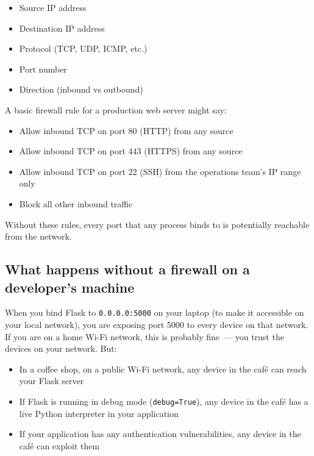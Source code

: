 \begin{itemize}
\tightlist
\item
  Source IP address
\item
  Destination IP address
\item
  Protocol (TCP, UDP, ICMP, etc.)
\item
  Port number
\item
  Direction (inbound vs outbound)
\end{itemize}

\noindent{}A basic firewall rule for a production web server might say:

\begin{itemize}
\tightlist
\item
  Allow inbound TCP on port 80 (HTTP) from any source
\item
  Allow inbound TCP on port 443 (HTTPS) from any source
\item
  Allow inbound TCP on port 22 (SSH) from the operations team's IP range only
\item
  Block all other inbound traffic
\end{itemize}

\noindent{}Without these rules, every port that any process binds to is potentially reachable from the network.

\subsection*{What happens without a firewall on a developer's machine}\label{10-networking-limitations:what-happens-without-a-firewall-on-a-developers-machine}

When you bind Flask to \texttt{0.0.0.0:5000} on your laptop (to make it accessible on your local network), you are exposing port 5000 to every device on that network. If you are on a home Wi-Fi network, this is probably fine~--- you trust the devices on your network. But:

\begin{itemize}
\tightlist
\item
  In a coffee shop, on a public Wi-Fi network, any device in the café can reach your Flask server
\item
  If Flask is running in debug mode (\texttt{debug=True}), any device in the café has a live Python interpreter in your application
\item
  If your application has any authentication vulnerabilities, any device in the café can exploit them
\end{itemize}

